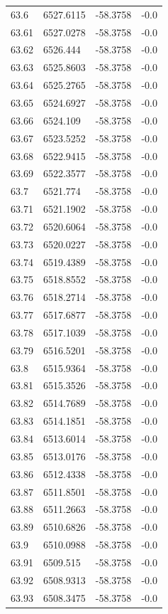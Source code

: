 \begin{table}[H]
\begin{tabular}{llll}
63.6 & 6527.6115 & -58.3758 & -0.0 \\
63.61 & 6527.0278 & -58.3758 & -0.0 \\
63.62 & 6526.444 & -58.3758 & -0.0 \\
63.63 & 6525.8603 & -58.3758 & -0.0 \\
63.64 & 6525.2765 & -58.3758 & -0.0 \\
63.65 & 6524.6927 & -58.3758 & -0.0 \\
63.66 & 6524.109 & -58.3758 & -0.0 \\
63.67 & 6523.5252 & -58.3758 & -0.0 \\
63.68 & 6522.9415 & -58.3758 & -0.0 \\
63.69 & 6522.3577 & -58.3758 & -0.0 \\
63.7 & 6521.774 & -58.3758 & -0.0 \\
63.71 & 6521.1902 & -58.3758 & -0.0 \\
63.72 & 6520.6064 & -58.3758 & -0.0 \\
63.73 & 6520.0227 & -58.3758 & -0.0 \\
63.74 & 6519.4389 & -58.3758 & -0.0 \\
63.75 & 6518.8552 & -58.3758 & -0.0 \\
63.76 & 6518.2714 & -58.3758 & -0.0 \\
63.77 & 6517.6877 & -58.3758 & -0.0 \\
63.78 & 6517.1039 & -58.3758 & -0.0 \\
63.79 & 6516.5201 & -58.3758 & -0.0 \\
63.8 & 6515.9364 & -58.3758 & -0.0 \\
63.81 & 6515.3526 & -58.3758 & -0.0 \\
63.82 & 6514.7689 & -58.3758 & -0.0 \\
63.83 & 6514.1851 & -58.3758 & -0.0 \\
63.84 & 6513.6014 & -58.3758 & -0.0 \\
63.85 & 6513.0176 & -58.3758 & -0.0 \\
63.86 & 6512.4338 & -58.3758 & -0.0 \\
63.87 & 6511.8501 & -58.3758 & -0.0 \\
63.88 & 6511.2663 & -58.3758 & -0.0 \\
63.89 & 6510.6826 & -58.3758 & -0.0 \\
63.9 & 6510.0988 & -58.3758 & -0.0 \\
63.91 & 6509.515 & -58.3758 & -0.0 \\
63.92 & 6508.9313 & -58.3758 & -0.0 \\
63.93 & 6508.3475 & -58.3758 & -0.0 \\

\end{tabular}
\end{table}
